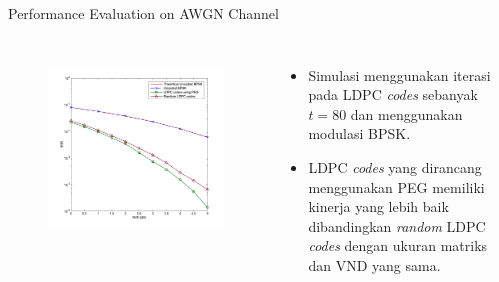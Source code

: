 \documentclass[11pt, aspectratio=169]{beamer}
\begin{document}
\begin{frame}{Performance Evaluation on AWGN Channel}
\vspace{-25pt}
\begin{columns}
\begin{figure}
\centering 
\includegraphics[scale=0.5]{gambarafa/sem}
\label{awgn} %
\end{figure}
\begin{itemize}
\item Simulasi menggunakan iterasi pada LDPC \textit{codes} sebanyak $t=80$ dan menggunakan modulasi BPSK.
\item LDPC \textit{codes} yang dirancang menggunakan PEG memiliki kinerja yang lebih baik dibandingkan \textit{random} LDPC \textit{codes}  dengan ukuran matriks dan VND yang sama.
\end{itemize}
\end{columns}
\end{frame}
\end{document}
